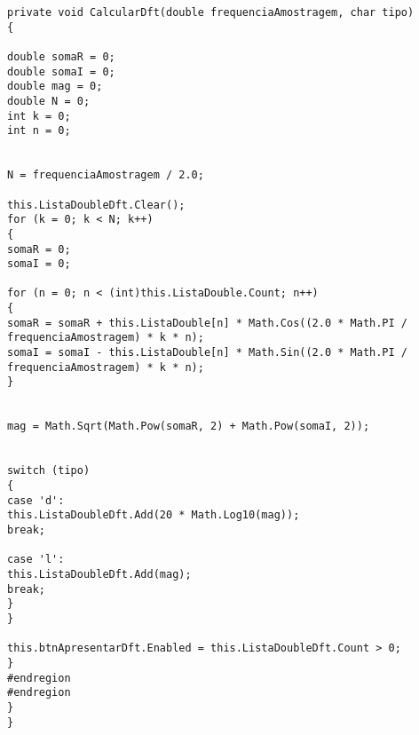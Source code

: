 \begin{apendicesenv}
\begin{lstlisting}[language={[Sharp]C}]
private void CalcularDft(double frequenciaAmostragem, char tipo)
{
 
double somaR = 0;
double somaI = 0;
double mag = 0;
double N = 0;
int k = 0;
int n = 0;


N = frequenciaAmostragem / 2.0;

this.ListaDoubleDft.Clear();
for (k = 0; k < N; k++)
{
somaR = 0;
somaI = 0;

for (n = 0; n < (int)this.ListaDouble.Count; n++)
{
somaR = somaR + this.ListaDouble[n] * Math.Cos((2.0 * Math.PI / frequenciaAmostragem) * k * n);
somaI = somaI - this.ListaDouble[n] * Math.Sin((2.0 * Math.PI / frequenciaAmostragem) * k * n);
}


mag = Math.Sqrt(Math.Pow(somaR, 2) + Math.Pow(somaI, 2));


switch (tipo)
{
case 'd':
this.ListaDoubleDft.Add(20 * Math.Log10(mag));
break;

case 'l':
this.ListaDoubleDft.Add(mag);
break;
}
}

this.btnApresentarDft.Enabled = this.ListaDoubleDft.Count > 0;
}
#endregion
#endregion
}
}
\end{lstlisting}



\end{apendicesenv}


